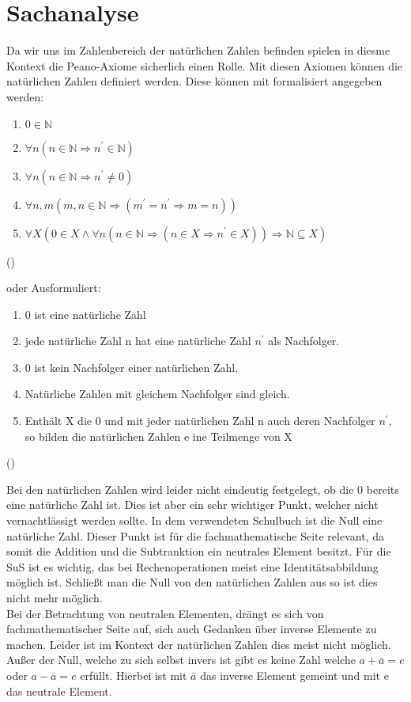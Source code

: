 \chapter{Sachanalyse}
Da wir uns im Zahlenbereich der natürlichen Zahlen befinden spielen in diesme Kontext die Peano-Axiome  sicherlich einen Rolle. Mit diesen Axiomen können die natürlichen Zahlen definiert werden. Diese können mit formalisiert angegeben werden:
\begin{enumerate}
\item $ 0\in \mathbb {N} $ 
\item $\forall n (n\in \mathbb {N} \Rightarrow n^\prime \in \mathbb {N})$ 
\item $\forall n (n\in \mathbb {N} \Rightarrow n^\prime \neq 0)$ 
\item $\forall n,m(m,n\in \mathbb {N}\Rightarrow(m^\prime = n^\prime \Rightarrow m = n))$ 
\item $\forall X (0 \in X \wedge \forall n (n \in \mathbb {N} \Rightarrow (n \in X \Rightarrow n^\prime \in X)) \Rightarrow \mathbb {N} \subseteq X)$
\end{enumerate}(\cite{forster2004analysis})

oder Ausformuliert: 

\begin{enumerate}
\item 0 ist eine natürliche Zahl 
\item jede natürliche Zahl n hat eine natürliche Zahl $n^\prime$ als Nachfolger. 
\item 0 ist kein Nachfolger einer natürlichen Zahl. 
\item Natürliche Zahlen mit gleichem Nachfolger sind gleich. 
\item Enthält X die 0 und mit jeder natürlichen Zahl n auch deren Nachfolger $n^\prime$, so bilden die natürlichen Zahlen e
ine Teilmenge von X
\end{enumerate}(\cite{forster2004analysis})


Bei den natürlichen Zahlen wird leider nicht eindeutig festgelegt, ob die 0 bereits eine natürliche Zahl ist. Dies ist aber ein sehr wichtiger Punkt, welcher nicht vernachtlässigt werden sollte. In dem verwendeten Schulbuch ist die Null eine natürliche Zahl. Dieser Punkt ist für die fachmathematische Seite relevant, da somit die Addition und die Subtranktion ein neutrales Element besitzt. Für die SuS ist es wichtig, das bei Rechenoperationen meist eine Identitätsabbildung möglich ist. Schließt man die Null von den natürlichen Zahlen aus so ist dies nicht mehr möglich. \\
Bei der Betrachtung von neutralen Elementen, drängt es sich von fachmathematischer Seite auf, sich auch Gedanken über inverse Elemente zu machen. Leider ist im Kontext der natürlichen Zahlen dies meist nicht möglich. Außer der Null, welche zu sich selbst invers ist gibt es keine Zahl welche $a + \bar
{a} = e$ oder $a - \bar
{a} = e$ erfüllt. Hierbei ist mit $ \bar
{a}$ das inverse Element gemeint und mit e das neutrale Element. 